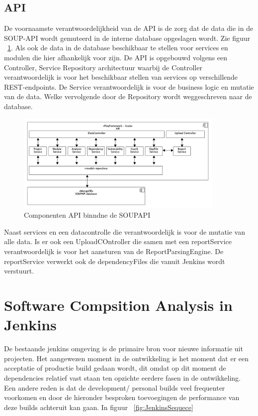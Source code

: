 \newpage %
\subsection{API}\label{subsec:api2}
De voornaamste verantwoordelijkheid van de API is de zorg dat de data die in de SOUP-API wordt gemuteerd in de interne database opgeslagen wordt. Zie figuur ~\ref{fig:SOUPAPI-API comps}. Als ook de data in de database beschikbaar te stellen voor services en modulen die hier afhankelijk voor zijn. De API is opgebouwd volgens een Controller, Service Repository architectuur waarbij de Controller verantwoordelijk is voor het beschikbaar stellen van services op verschillende REST-endpoints. De Service verantwoordelijk is voor de business logic en mutatie van de data. Welke vervolgende door de Repository wordt weggeschreven naar de database.
\begin{figure}[bth]
    \myfloatalign
    \includegraphics[width=10cm]{gfx/umlet/exports/API-ComponentsDiagram}
    \caption{Componenten API binndne de SOUPAPI}
    \label{fig:SOUPAPI-API comps}
\end{figure}

Naast services en een datacontrolle die verantwoordelijk is voor de mutatie van alle data. Is er ook een UploadCOntroller die samen met een reportService verantwoordelijk is voor het aansturen van de ReportParsingEngine. De reportService verwerkt ook de dependencyFiles die vanuit Jenkins wordt verstuurt.

\section{Software Compsition Analysis in Jenkins}\label{sec:jenkins}
De bestaande jenkins omgeving is de primaire bron voor nieuwe informatie uit projecten. Het aangewezen moment in de ontwikkeling is het moment dat er een acceptatie of productie build gedaan wordt, dit omdat op dit moment de dependencies relatief vast staan ten opzichte eerdere fasen in de ontwikkeling. Een andere reden is dat de development/ personal builds veel frequenter voorkomen en door de hieronder besproken toevoegingen de performance van deze builds achteruit kan gaan. In figuur ~\ref{fig:JenkinsSequece}


